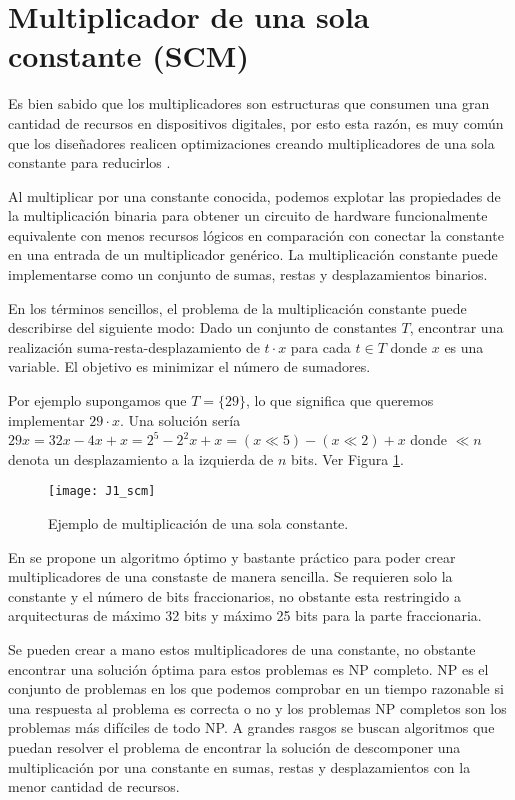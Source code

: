     \section{Multiplicador de una sola constante (SCM)}

        Es bien sabido que los multiplicadores son estructuras que consumen una gran cantidad de recursos en dispositivos digitales, por esto esta razón, es muy común que los diseñadores realicen optimizaciones creando multiplicadores de una sola constante para reducirlos \cite{Thong2010, GuillenFernandez2019}.

        Al multiplicar por una constante conocida, podemos explotar las propiedades de la multiplicación binaria para obtener un circuito de hardware funcionalmente equivalente con menos recursos lógicos en comparación con conectar la constante en una entrada de un multiplicador genérico. La multiplicación constante puede implementarse como un conjunto de sumas, restas y desplazamientos binarios.

            En los términos sencillos, el problema de la multiplicación constante puede describirse del siguiente modo: Dado un conjunto de constantes $T$, encontrar una realización suma-resta-desplazamiento de $t \cdot x$ para cada $t \in T$ donde $x$ es una variable. El objetivo es minimizar el número de sumadores.
            
            Por ejemplo supongamos que $T = \{29 \}$, lo que significa que queremos implementar $29 \cdot x$. Una solución sería $29x = 32x - 4x +x = 2^{5} - 2^{2}x + x = (x \ll 5) - (x \ll 2) + x$ donde $ \ll n $ denota un desplazamiento a la izquierda de $n$ bits. Ver Figura \ref{fig:J1_scm}.

        \begin{figure}[hbtp]
            \caption{Ejemplo de multiplicación de una sola constante.}
            \centering
            \texttt{[image: J1\_scm]}
            \label{fig:J1_scm}
        \end{figure}
        
        En \cite{Thong2011} se propone un algoritmo óptimo y bastante práctico para poder crear multiplicadores de una constaste de manera sencilla. Se requieren solo la constante y el número de bits fraccionarios, no obstante esta restringido a arquitecturas de máximo 32 bits y máximo 25 bits para la parte fraccionaria.

        Se pueden crear a mano estos multiplicadores de una constante, no obstante encontrar una solución óptima para estos problemas es NP completo. NP es el conjunto de problemas en los que podemos comprobar en un tiempo razonable si una respuesta al problema es correcta o no y los problemas NP completos son los problemas más difíciles de todo NP. A grandes rasgos se buscan algoritmos que puedan resolver el problema de encontrar la solución de descomponer una multiplicación por una constante en sumas, restas y desplazamientos con la menor cantidad de recursos.

